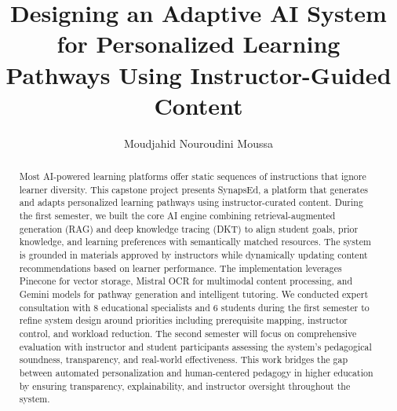 \documentclass{stylefiles/capstone}
\begin{document}
\title{Designing an Adaptive AI System for Personalized Learning Pathways Using Instructor-Guided Content}


\author{Moudjahid Nouroudini Moussa}


\renewcommand{\shortauthors}{Moudjahid}

\begin{abstract}
Most AI-powered learning platforms offer static sequences of instructions that ignore learner diversity. This capstone project presents SynapsEd, a platform that generates and adapts personalized learning pathways using instructor-curated content. During the first semester, we built the core AI engine combining retrieval-augmented generation (RAG) and deep knowledge tracing (DKT) to align student goals, prior knowledge, and learning preferences with semantically matched resources. The system is grounded in materials approved by instructors while dynamically updating content recommendations based on learner performance. The implementation leverages Pinecone for vector storage, Mistral OCR for multimodal content processing, and Gemini models for pathway generation and intelligent tutoring. We conducted expert consultation with 8 educational specialists and 6 students during the first semester to refine system design around priorities including prerequisite mapping, instructor control, and workload reduction. The second semester will focus on comprehensive evaluation with instructor and student participants assessing the system's pedagogical soundness, transparency, and real-world effectiveness. This work bridges the gap between automated personalization and human-centered pedagogy in higher education by ensuring transparency, explainability, and instructor oversight throughout the system.
\end{abstract}


\maketitle
\end{document}
